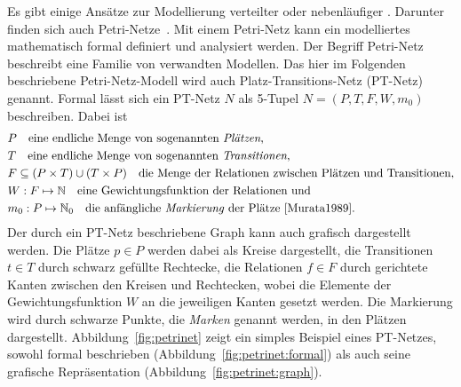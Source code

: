 Es gibt einige Ansätze zur Modellierung verteilter oder nebenläufiger . Darunter finden sich auch Petri-Netze~\cite{Murata1989}. Mit einem Petri-Netz kann ein modelliertes  mathematisch formal definiert und analysiert werden. Der Begriff Petri-Netz beschreibt eine Familie von verwandten Modellen. Das hier im Folgenden beschriebene Petri-Netz-Modell wird auch Platz-Transitions-Netz (PT-Netz) genannt. Formal lässt sich ein PT-Netz $N$ als 5-Tupel $ N=(P,T,F,W,m_0)$ beschreiben. Dabei ist 
\begin{align*}
	&P  \quad \text{eine endliche Menge von sogenannten \emph{Plätzen},}\\
	&T  \quad \text{eine endliche Menge von sogenannten \emph{Transitionen},}\\
	&F \subseteq (P\times T) \cup (T \times P) \quad \text{die Menge der Relationen zwischen Plätzen und Transitionen,}\\
	&W: F \mapsto \mathbb{N}  \quad \text{eine Gewichtungsfunktion der Relationen und}\\
	&m_0: P \mapsto \mathbb{N}_0   \quad \text{die anfängliche \emph{Markierung} der Plätze~\cite{Murata1989}.}
\end{align*}
Der durch ein PT-Netz beschriebene Graph kann auch grafisch dargestellt werden. Die Plätze $p \in P$ werden dabei als Kreise dargestellt, die Transitionen $ t \in T$ durch schwarz gefüllte Rechtecke, die Relationen $ f \in F$ durch gerichtete Kanten zwischen den Kreisen und Rechtecken, wobei die Elemente der Gewichtungsfunktion $W$ an die jeweiligen Kanten gesetzt werden. Die Markierung wird durch schwarze Punkte, die \emph{Marken} genannt werden, in den Plätzen dargestellt. Abbildung~\ref{fig:petrinet} zeigt ein simples Beispiel eines PT-Netzes, sowohl formal beschrieben (Abbildung~\ref{fig:petrinet:formal}) als auch seine grafische Repräsentation (Abbildung~\ref{fig:petrinet:graph}).
